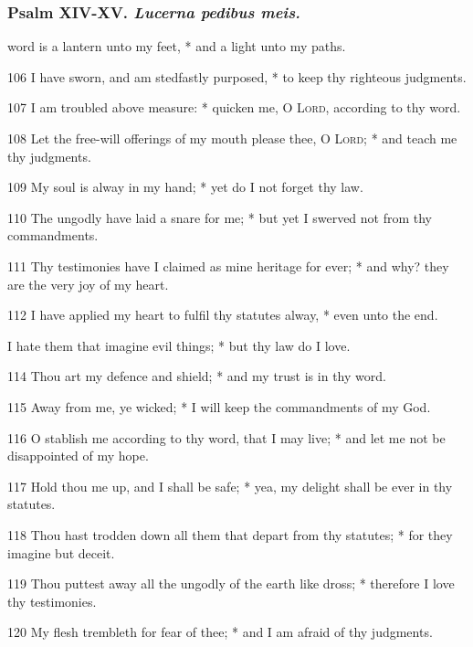 \subsubsection{Psalm XIV-XV. \textit{Lucerna pedibus meis.}}
 word is a lantern unto my feet, * and a light unto my paths.
\par
    106 I have sworn, and am stedfastly purposed, * to keep thy righteous judgments.
\par
    107 I am troubled above measure: * quicken me, O \textsc{Lord}, according to thy word.
\par
    108 Let the free-will offerings of my mouth please thee, O \textsc{Lord}; * and teach me thy judgments.
\par
    109 My soul is alway in my hand; * yet do I not forget thy law.
\par
    110 The ungodly have laid a snare for me; * but yet I swerved not from thy commandments.
\par
    111 Thy testimonies have I claimed as mine heritage for ever; * and why? they are the very joy of my heart.
\par
    112 I have applied my heart to fulfil thy statutes alway, * even unto the end.
\par
I hate them that imagine evil things; * but thy law do I love.
\par
    114 Thou art my defence and shield; * and my trust is in thy word.
\par
    115 Away from me, ye wicked; * I will keep the commandments of my God.
\par
    116 O stablish me according to thy word, that I may live; * and let me not be disappointed of my hope.
\par
    117 Hold thou me up, and I shall be safe; * yea, my delight shall be ever in thy statutes.
\par
    118 Thou hast trodden down all them that depart from thy statutes; * for they imagine but deceit.
\par
    119 Thou puttest away all the ungodly of the earth like dross; * therefore I love thy testimonies.
\par
    120 My flesh trembleth for fear of thee; * and I am afraid of thy judgments.
